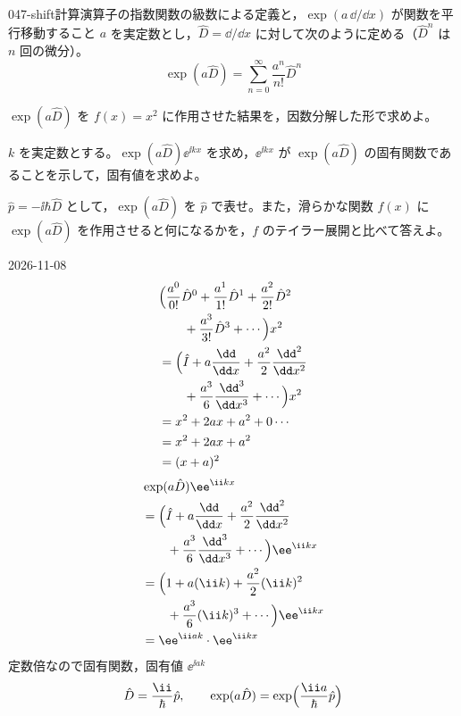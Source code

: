 \documentclass[uplatex,dvipdfmx,a4paper,11pt]{jsarticle}
\begin{document}
\begin{mondai}{047-shift}{計算}{演算子の指数関数の級数による定義と，$\exp(a\,\dd/\dd x)$ が関数を平行移動すること}
$a$ を実定数とし，$\hat{D}=\dd/\dd x$ に対して次のように定める（$\hat{D}^{n}$ は $n$ 回の微分）。
  \[ \exp(a\hat{D})=\sum_{n=0}^{\infty}\frac{a^{n}}{n!}\hat{D}^{n} \]
  \begin{shoumon}
    \item $\exp(a\hat{D})$ を $f(x)=x^{2}$ に作用させた結果を，因数分解した形で求めよ。
    \item $k$ を実定数とする。$\exp(a\hat{D})\ee^{\ii kx}$ を求め，$\ee^{\ii kx}$ が $\exp(a\hat{D})$ の固有関数であることを示して，固有値を求めよ。
    \item $\hat{p}=-\ii\hbar\hat{D}$ として，$\exp(a\hat{D})$ を $\hat{p}$ で表せ。また，滑らかな関数 $f(x)$ に $\exp(a\hat{D})$ を作用させると何になるかを，$f$ のテイラー展開と比べて答えよ。
  \end{shoumon}
\begin{kotaeutsushi}{2026-11-08}
\begin{align*}
&\Bigl(\frac{a^{0}}{0!}\hat{D}^{0}+\frac{a^{1}}{1!}\hat{D}^{1}+\frac{a^{2}}{2!}\hat{D}^{2}\\
&\qquad+\frac{a^{3}}{3!}\hat{D}^{3}+\cdots\Bigr)x^{2}\\
&=\Bigl(\hat{I}+a\frac{\dd}{\dd x}+\frac{a^{2}}{2}\frac{\dd^{2}}{\dd x^{2}}\\
&\qquad+\frac{a^{3}}{6}\frac{\dd^{3}}{\dd x^{3}}+\cdots\Bigr)x^{2}\\
&=x^{2}+2ax+a^{2}+0\cdots\\
&=x^{2}+2ax+a^{2}\\
&=(x+a)^{2}
\end{align*}
\begin{align*}
&\exp(a\hat{D})\ee^{\ii kx}\\
&=\Bigl(\hat{I}+a\frac{\dd}{\dd x}+\frac{a^{2}}{2}\frac{\dd^{2}}{\dd x^{2}}\\
&\qquad+\frac{a^{3}}{6}\frac{\dd^{3}}{\dd x^{3}}+\cdots\Bigr)\ee^{\ii kx}\\
&=\Bigl(1+a(\ii k)+\frac{a^{2}}{2}(\ii k)^{2}\\
&\qquad+\frac{a^{3}}{6}(\ii k)^{3}+\cdots\Bigr)\ee^{\ii kx}\\
&=\ee^{\ii ak}\cdot\ee^{\ii kx}
\end{align*}
定数倍なので固有関数，固有値 $\ee^{\ii ak}$
\[ \hat{D}=\frac{\ii}{\hbar}\hat{p},\qquad \exp(a\hat{D})=\exp\Bigl(\frac{\ii a}{\hbar}\hat{p}\Bigr) \]

\end{kotaeutsushi}
\end{mondai}
\end{document}
